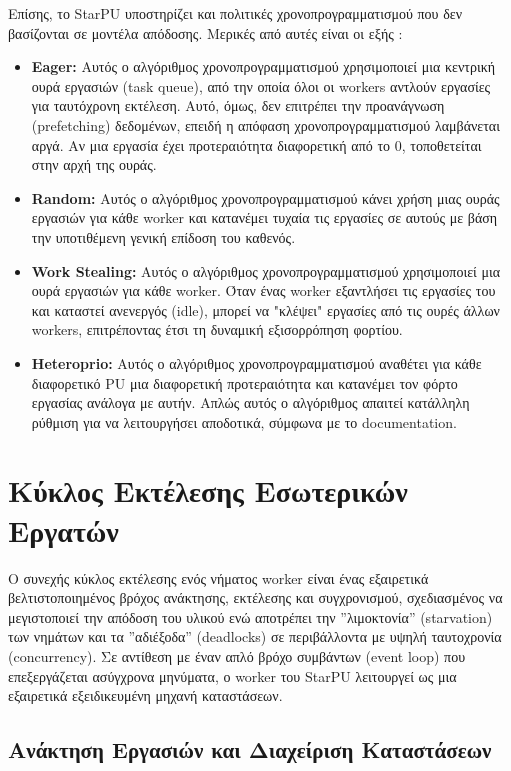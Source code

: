 Επίσης, το StarPU υποστηρίζει και πολιτικές χρονοπρογραμματισμού που δεν βασίζονται σε μοντέλα απόδοσης. Μερικές από αυτές είναι οι εξής \cite{starpu2025handbook}:

\begin{itemize}
  \item \textbf{Eager:} Αυτός ο αλγόριθμος χρονοπρογραμματισμού χρησιμοποιεί μια κεντρική ουρά εργασιών (task queue), από την οποία όλοι οι workers αντλούν εργασίες για ταυτόχρονη εκτέλεση. Αυτό, όμως, δεν επιτρέπει την προανάγνωση (prefetching) δεδομένων, επειδή η απόφαση χρονοπρογραμματισμού λαμβάνεται αργά. Αν μια εργασία έχει προτεραιότητα διαφορετική από το 0, τοποθετείται στην αρχή της ουράς.
  \item \textbf{Random:} Αυτός ο αλγόριθμος χρονοπρογραμματισμού κάνει χρήση μιας ουράς εργασιών για κάθε worker και κατανέμει τυχαία τις εργασίες σε αυτούς με βάση την υποτιθέμενη γενική επίδοση του καθενός.
  \item \textbf{Work Stealing:} Αυτός ο αλγόριθμος χρονοπρογραμματισμού χρησιμοποιεί μια ουρά εργασιών για κάθε worker. Όταν ένας worker εξαντλήσει τις εργασίες του και καταστεί ανενεργός (idle), μπορεί να "κλέψει" εργασίες από τις ουρές άλλων workers, επιτρέποντας έτσι τη δυναμική εξισορρόπηση φορτίου.
  \item \textbf{Heteroprio:} Αυτός ο αλγόριθμος χρονοπρογραμματισμού αναθέτει για κάθε διαφορετικό PU μια διαφορετική προτεραιότητα και κατανέμει τον φόρτο εργασίας ανάλογα με αυτήν. Απλώς αυτός ο αλγόριθμος απαιτεί κατάλληλη ρύθμιση για να λειτουργήσει αποδοτικά, σύμφωνα με το documentation.
\end{itemize}

\section{Κύκλος Εκτέλεσης Εσωτερικών Εργατών}

Ο συνεχής κύκλος εκτέλεσης ενός νήματος worker είναι ένας εξαιρετικά βελτιστοποιημένος βρόχος ανάκτησης, εκτέλεσης και συγχρονισμού, σχεδιασμένος να μεγιστοποιεί την απόδοση του υλικού ενώ αποτρέπει την ''λιμοκτονία'' (starvation) των νημάτων και τα ''αδιέξοδα'' (deadlocks) σε περιβάλλοντα με υψηλή ταυτοχρονία (concurrency). Σε αντίθεση με έναν απλό βρόχο συμβάντων (event loop) που επεξεργάζεται ασύγχρονα μηνύματα, ο worker του StarPU λειτουργεί ως μια εξαιρετικά εξειδικευμένη μηχανή καταστάσεων.

\subsection{Ανάκτηση Εργασιών και Διαχείριση Καταστάσεων}


